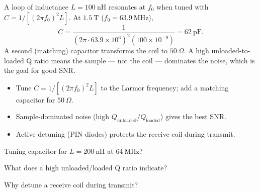 \begin{workedexample}
A loop of inductance $L = 100\ \text{nH}$ resonates at $f_0$ when tuned with
$C = 1/[(2\pi f_0)^2 L]$. At $1.5\ \text{T}$ ($f_0 = 63.9\ \text{MHz}$),
\[ C = \frac{1}{(2\pi\cdot63.9\times10^6)^2(100\times10^{-9})} = 62\ \text{pF}. \]
A second (matching) capacitor transforms the coil to $50\ \Omega$. A high
unloaded-to-loaded Q ratio means the sample --- not the coil --- dominates the
noise, which is the goal for good SNR.
\end{workedexample}

\begin{keytakeaways}
\begin{itemize}[leftmargin=1.4em,itemsep=2pt]
\item Tune $C = 1/[(2\pi f_0)^2 L]$ to the Larmor frequency; add a matching capacitor for $50\ \Omega$.
\item Sample-dominated noise (high $Q_{\text{unloaded}}/Q_{\text{loaded}}$) gives the best SNR.
\item Active detuning (PIN diodes) protects the receive coil during transmit.
\end{itemize}
\end{keytakeaways}

\begin{exercises}
\item Tuning capacitor for $L = 200\ \text{nH}$ at $64\ \text{MHz}$?
\item What does a high unloaded/loaded Q ratio indicate?
\item Why detune a receive coil during transmit?
\end{exercises}

